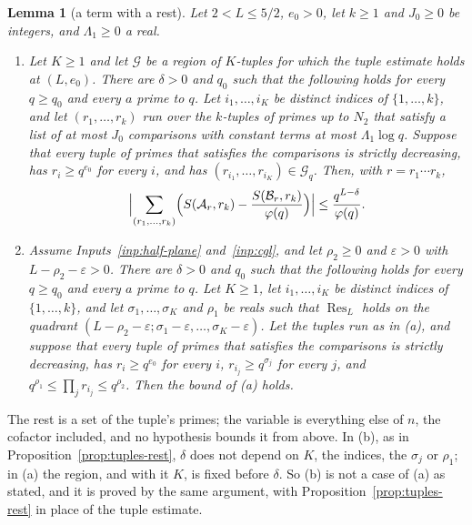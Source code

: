 \documentclass[11pt]{article}
\newtheorem{lemma}[theorem]{Lemma}
\theoremstyle{definition}
\begin{document}
\begin{lemma}[a term with a rest]\label{lem:term-rest}
Let $2 < L \le 5/2$, $e_0 > 0$, let $k \ge 1$ and $J_0 \ge 0$ be integers, and $\Lambda_1 \ge 0$ a real.
\begin{enumerate}
\item[(a)] Let $K \ge 1$ and let $\mathcal G$ be a region of $K$-tuples for which the tuple estimate holds at $(L,
  e_0)$. There are $\delta > 0$ and $q_0$ such that the following holds for every $q \ge q_0$ and every $a$ prime to
  $q$. Let $i_1, \dots, i_K$ be distinct indices of $\{1, \dots, k\}$, and let $(r_1, \dots, r_k)$ run over the
  $k$-tuples of primes up to $N_2$ that satisfy a list of at most $J_0$ comparisons with constant terms at most
  $\Lambda_1 \log q$. Suppose that every tuple of primes that satisfies the comparisons is strictly decreasing, has
  $r_i \ge q^{e_0}$
  for every $i$, and has $(r_{i_1}, \dots, r_{i_K}) \in \mathcal G_q$. Then, with $r = r_1 \cdots r_k$,
  \[
    \Bigl|\sum_{(r_1, \dots, r_k)} \Bigl(S(\mathcal A_r, r_k) - \frac{S(\mathcal B_r, r_k)}{\varphi(q)}\Bigr)\Bigr|
    \le \frac{q^{L - \delta}}{\varphi(q)}.
  \]
\item[(b)] Assume Inputs~\ref{inp:half-plane} and~\ref{inp:cgl}, and let $\rho_2 \ge 0$ and $\varepsilon > 0$ with $L -
\rho_2 -
  \varepsilon > 0$. There are $\delta > 0$ and $q_0$ such that the following holds for every $q \ge q_0$ and every $a$
  prime to $q$. Let $K \ge 1$, let $i_1, \dots, i_K$ be distinct indices of $\{1, \dots, k\}$, and let $\sigma_1,
  \dots, \sigma_K$ and $\rho_1$ be reals such that $\operatorname{Res}_L$ holds on the quadrant $(L - \rho_2 -
  \varepsilon; \sigma_1 - \varepsilon, \dots, \sigma_K - \varepsilon)$. Let the tuples run as in (a), and suppose that
  every tuple of primes that satisfies the comparisons is strictly decreasing, has $r_i \ge q^{e_0}$ for every $i$,
  $r_{i_j} \ge q^{\sigma_j}$ for every $j$, and $q^{\rho_1} \le \prod_j r_{i_j} \le q^{\rho_2}$. Then the bound of (a)
  holds.
\end{enumerate}
\end{lemma}

The rest is a set of the tuple's primes; the variable is everything else of $n$, the cofactor included, and no
hypothesis bounds it from above. In (b), as in Proposition~\ref{prop:tuples-rest}, $\delta$ does not depend on $K$, the
indices, the $\sigma_j$ or $\rho_1$; in (a) the region, and with it $K$, is fixed before $\delta$. So (b) is not a case
of (a) as stated, and it is proved by the same argument, with Proposition~\ref{prop:tuples-rest} in place of the tuple
estimate.
\end{document}
